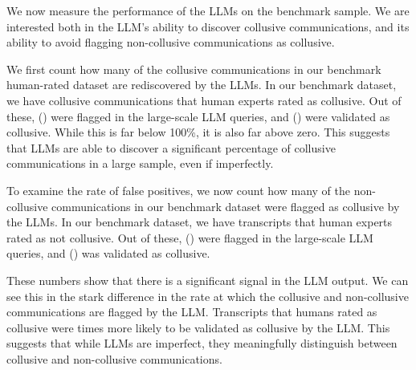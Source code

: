We now measure the performance of the LLMs on the benchmark sample. We are interested both in the LLM's ability to discover collusive communications, and its ability to avoid flagging non-collusive communications as collusive.

We first count how many of the collusive communications in our benchmark human-rated dataset are rediscovered by the LLMs. In our benchmark dataset, we have  collusive communications that human experts rated as collusive. Out of these,  () were flagged in the large-scale LLM queries, and  () were validated as collusive. While this is far below 100\%, it is also far above zero. This suggests that LLMs are able to discover a significant percentage of collusive communications in a large sample, even if imperfectly.

To examine the rate of false positives, we now count how many of the non-collusive communications in our benchmark dataset were flagged as collusive by the LLMs. In our benchmark dataset, we have  transcripts that human experts rated as not collusive. Out of these,  () were flagged in the large-scale LLM queries, and  () was validated as collusive.

These numbers show that there is a significant signal in the LLM output. We can see this in the stark difference in the rate at which the collusive and non-collusive communications are flagged by the LLM. Transcripts that humans rated as collusive were  times more likely to be validated as collusive by the LLM. This suggests that while LLMs are imperfect, they meaningfully distinguish between collusive and non-collusive communications.